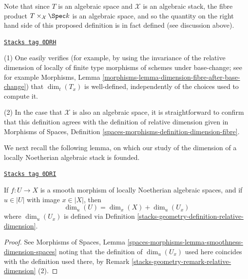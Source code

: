 Note that since $T$ is an algebraic space and $\mathcal{X}$ is an
algebraic stack, the fibre product $T \times_{\mathcal{X}} \Spec k$
is an algebraic space, and so the quantity on the right hand side of
this proposed definition is in fact defined (see discussion above).

\begin{remark}
\label{stacks-geometry-remark-relative-dimension}
\href{https://stacks.math.columbia.edu/tag/0DRH}{\texttt{Stacks tag 0DRH}}

(1)
One easily verifies (for example, by using the invariance
of the relative dimension of locally of finite type morphisms of schemes
under base-change; see for example
Morphisms, Lemma \ref{morphisms-lemma-dimension-fibre-after-base-change})
that $\dim_t(T_x)$ is well-defined, independently of the choices
used to compute it.

\medskip\noindent
(2)
In the case that $\mathcal{X}$ is also an algebraic space,
it is straightforward to confirm that this definition agrees with
the definition of relative dimension given in
Morphisms of Spaces, Definition
\ref{spaces-morphisms-definition-dimension-fibre}.
\end{remark}

We next recall the following lemma, on which our study of
the dimension of a locally Noetherian algebraic stack is founded.

\begin{lemma}
\label{stacks-geometry-lemma-behaviour-of-dimensions-wrt-smooth-morphisms}
\href{https://stacks.math.columbia.edu/tag/0DRI}{\texttt{Stacks tag 0DRI}}

If $f: U \to X$ is a smooth morphism of locally Noetherian algebraic
spaces, and
if $u \in |U|$ with image $x \in |X|$, then
$$
\dim_u (U) = \dim_x(X) + \dim_{u} (U_x)
$$
where $\dim_u (U_x)$ is defined via
Definition \ref{stacks-geometry-definition-relative-dimension}.
\end{lemma}

\begin{proof}
See Morphisms of Spaces, Lemma
\ref{spaces-morphisms-lemma-smoothness-dimension-spaces}
noting that the definition of $\dim_u (U_x)$ used here coincides with
the definition used there, by Remark \ref{stacks-geometry-remark-relative-dimension} (2).
\end{proof}

